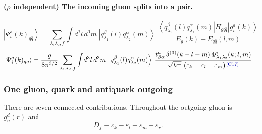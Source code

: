 \documentclass[11pt]{article}
\newcommand{\eps}{\varepsilon}
\newcommand{\dthree}{\delta^{(3)}}
\newcommand{\ket}[1]{\left|#1\right\rangle}
\newcommand{\bra}[1]{\left\langle#1\right|}
\newcommand{\Ph}{\Phi}
\newcommand{\qk}[3]{q^{#1}_{#2}(#3)}
\newcommand{\aqk}[3]{\bar q^{#1}_{#2}(#3)}
\newcommand{\gl}[3]{g^{#1}_{#2}(#3)}
\newcommand{\chg}[1]{{\color{blue!70!black}\textsuperscript{\,[C#1]}}}
\begin{document}
\paragraph{($\rho$ independent) The incoming gluon splits into a pair.}
\begin{center}
\end{center}
\begin{equation}
\ket{\Psi^{a}_{i}(k)_{q\bar q}}=\sum_{\lambda_{1}\lambda_{2},f}\int\! d^{3}l\,d^{3}m\;
\ket{\qk{\beta}{\lambda_{1}}{l}\aqk{\alpha}{\lambda_{2}}{m}}\;
\frac{\bra{\qk{\beta}{\lambda_{1}}{l}\aqk{\alpha}{\lambda_{2}}{m}}H_{gq\bar q}\ket{\gl{a}{i}{k}}}
{E_{g}(k)-E_{q\bar q}(l,m)}
\end{equation}
\begin{equation}
\ket{\Psi^{a}_{i}(k)_{q\bar q}}=\frac{g}{8\pi^{3/2}}\sum_{\lambda_{1}\lambda_{2},f}
\int\! d^{3}l\,d^{3}m\;\ket{\qk{\beta}{\lambda_{1}}{l}\aqk{\alpha}{\lambda_{2}}{m}}\;
\frac{t^{a}_{\beta\alpha}\,\dthree(k-l-m)\,\Ph^{i}_{\lambda_{1}\lambda_{2}}(k;l,m)}
{\sqrt{k^{+}}\;\big(\eps_{k}-\eps_{l}-\eps_{m}\big)\chg{17}}
\label{eq:Pg}
\end{equation}

\subsubsection{One gluon, quark and antiquark outgoing}

There are seven connected contributions. Throughout the outgoing gluon is $\gl{d}{n}{r}$ and
\begin{equation}
D_{f}\equiv\eps_{k}-\eps_{l}-\eps_{m}-\eps_{r} .
\end{equation}
\end{document}

